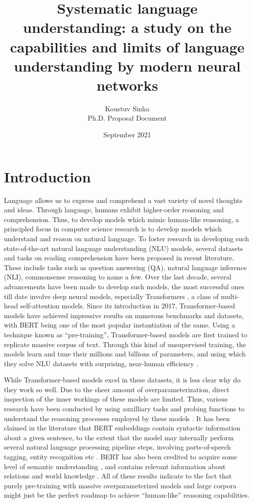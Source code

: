 \documentclass[12pt]{article}
\title{Systematic language understanding: a study on the capabilities and limits of language understanding by modern neural networks}
\author{Koustuv Sinha \\ Ph.D. Proposal Document}
\date{September 2021}
\begin{document}
\maketitle

\section{Introduction}

Language allows us to express and comprehend a vast variety of novel thoughts and ideas. Through language, humans exhibit higher-order reasoning and comprehension. Thus, to develop models which mimic human-like reasoning, a principled focus in computer science research is to develop models which understand and reason on natural language. To foster research in developing such state-of-the-art natural language understanding (NLU) models, several datasets and tasks on reading comprehension have been proposed in recent literature. These include tasks such as question answering (QA), natural language inference (NLI), commonsense reasoning to name a few. Over the last decade, several advancements have been made to develop such models, the most successful ones till date involve deep neural models, especially Transformers \CITE, a class of multi-head self-attention models. Since its introduction in 2017, Transformer-based models have achieved impressive results on numerous benchmarks and datasets, with BERT \CITE being one of the most popular instantiation of the same. Using a technique known as ``pre-training'', Transformer-based models are first trained to replicate massive corpus of text. Through this kind of unsupervised training, the models learn and tune their millions and billions of parameters, and using which they solve NLU datasets with surprising, near-human efficiency \CITE.

While Transformer-based models excel in these datasets, it is less clear why do they work so well. Due to the sheer amount of overparameterization, direct inspection of the inner workings of these models are limited. Thus, various research have been conducted by using auxilliary tasks and probing functions to understand the reasoning processes employed by these models \cite{rogers2020}. It has been claimed in the literature that BERT embeddings contain syntactic information about a given sentence, to the extent that the model may internally perform several natural language processing pipeline steps, involving parts-of-speech tagging, entity recognition etc \CITE. BERT has also been credited to acquire some level of semantic understanding \CITE, and contains relevant information about relations and world knowledge \CITE. All of these results indicate to the fact that purely pre-training with massive overparameterized models and large corpora might just be the perfect roadmap to achieve ``human-like'' reasoning capabilities.
\end{document}
